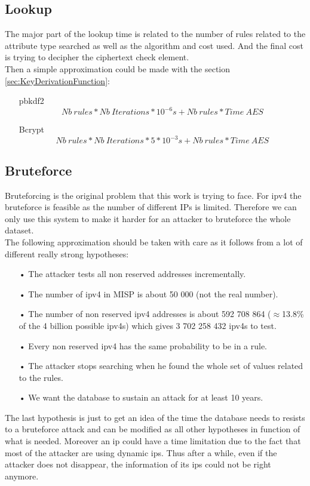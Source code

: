 \documentclass{eplmastersthesis}
\begin{document}
\subsection{Lookup}
The major part of the lookup time is related to the number of rules related to the attribute type searched as well as the algorithm and cost used. And the final cost is trying to decipher the ciphertext check element.\\

Then a simple approximation could be made with the section \ref{sec:KeyDerivationFunction}:
\begin{itemize}
\item[\gls{pbkdf2}] $$Nb\ rules * Nb\ Iterations * 10^{-6}s + Nb\ rules * Time\ AES$$
\item[Bcrypt]  $$Nb\ rules * Nb\ Iterations * 5 * 10^{-3}s + Nb\ rules * Time\ AES$$
\end{itemize}

\subsection{Bruteforce}
Bruteforcing is the original problem that this work is trying to face. For \gls{ipv4} the bruteforce is feasible as the number of different IPs is limited. Therefore we can only use this system to make it harder for an attacker to bruteforce the whole dataset.\\

The following approximation should be taken with care as it follows from a lot of different really strong hypotheses:
\begin{itemize}
\item[•] The attacker tests all non reserved addresses incrementally.
\item[•] The number of \gls{ipv4} in MISP is about 50 000 (not the real number).
\item[•] The number of non reserved \gls{ipv4} addresses is about 592 708 864 ($\approx$13.8\% of the 4 billion possible \glspl{ipv4}) which gives 3 702 258 432 \glspl{ipv4} to test.
\item[•] Every non reserved \gls{ipv4} has the same probability to be in a rule.
\item[•] The attacker stops searching when he found the whole set of values related to the rules.
\item[•] We want the database to sustain an attack for at least 10 years.
\end{itemize}
The last hypothesis is just to get an idea of the time the database needs to resists to a bruteforce attack and can be modified as all other hypotheses in function of what is needed.
Moreover an \gls{ip} could have a time limitation due to the fact that most of the attacker are using dynamic \glspl{ip}. Thus after a while, even if the attacker does not disappear, the information of its \glspl{ip} could not be right anymore.\\
\end{document}
